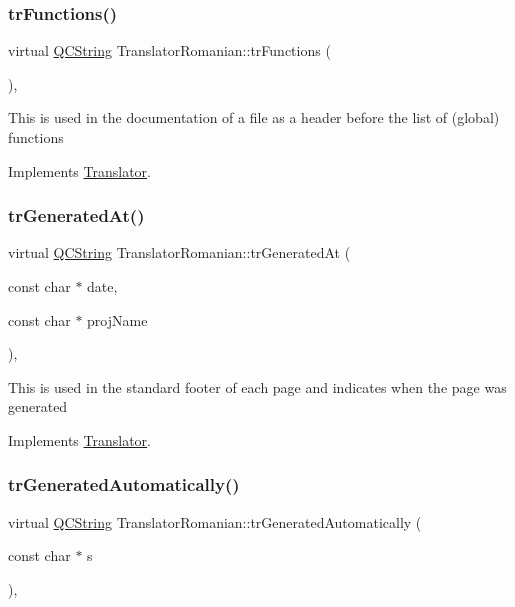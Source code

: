 \subsubsection{\texorpdfstring{trFunctions()}{trFunctions()}}
{\footnotesize\ttfamily virtual \mbox{\hyperlink{class_q_c_string}{Q\+C\+String}} Translator\+Romanian\+::tr\+Functions (\begin{DoxyParamCaption}{ }\end{DoxyParamCaption})\hspace{0.3cm}{\ttfamily [inline]}, {\ttfamily [virtual]}}

This is used in the documentation of a file as a header before the list of (global) functions 

Implements \mbox{\hyperlink{class_translator}{Translator}}.

\mbox{\label{class_translator_romanian_ab9f7836ca98198e2f8581e7a41792fbd}} 
\subsubsection{\texorpdfstring{trGeneratedAt()}{trGeneratedAt()}}
{\footnotesize\ttfamily virtual \mbox{\hyperlink{class_q_c_string}{Q\+C\+String}} Translator\+Romanian\+::tr\+Generated\+At (\begin{DoxyParamCaption}\item[{const char $\ast$}]{date,  }\item[{const char $\ast$}]{proj\+Name }\end{DoxyParamCaption})\hspace{0.3cm}{\ttfamily [inline]}, {\ttfamily [virtual]}}

This is used in the standard footer of each page and indicates when the page was generated 

Implements \mbox{\hyperlink{class_translator}{Translator}}.

\mbox{\label{class_translator_romanian_a13082180dd45eeb8e68a222354b8cf6f}} 
\subsubsection{\texorpdfstring{trGeneratedAutomatically()}{trGeneratedAutomatically()}}
{\footnotesize\ttfamily virtual \mbox{\hyperlink{class_q_c_string}{Q\+C\+String}} Translator\+Romanian\+::tr\+Generated\+Automatically (\begin{DoxyParamCaption}\item[{const char $\ast$}]{s }\end{DoxyParamCaption})\hspace{0.3cm}{\ttfamily [inline]}, {\ttfamily [virtual]}}

